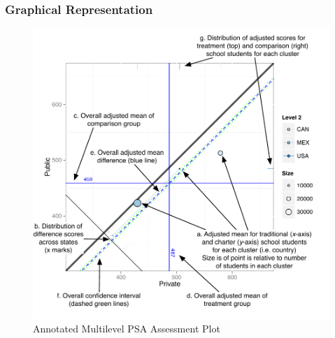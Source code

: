 \documentclass[letterpaper,12p,twoside]{article} %
\begin{document}
\subsubsection{Graphical Representation}

\begin{figure}[t]
\begin{center}
\includegraphics[width=.9\textwidth]{../Figures/AnnotatedCircPlot.pdf}
\caption{Annotated Multilevel PSA Assessment Plot}
\label{fig:g8math:circ}
\end{center}
\end{figure}
\end{document}
